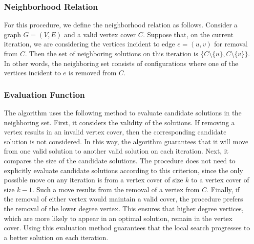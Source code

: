 \documentclass{sig-alternate-05-2015}
\begin{document}
\subsubsection{Neighborhood Relation}
For this procedure, we define the neighborhood relation as follows. Consider a graph $G=(V,E)$ and a valid vertex cover $C$. Suppose that, on the current iteration, we are considering the vertices incident to edge $e=(u,v)$ for removal from $C$. Then the set of neighboring solutions on this iteration is $ \lbrace C \setminus \lbrace u \rbrace, C \setminus \lbrace v \rbrace \rbrace$. In other words, the neighboring set consists of configurations where one of the vertices incident to $e$ is removed from $C$.  
\subsubsection{Evaluation Function}
The algorithm uses the following method to evaluate candidate solutions in the neighboring set. First, it considers the validity of the solutions. If removing a vertex results in an invalid vertex cover, then the corresponding candidate solution is not considered. In this way, the algorithm guarantees that it will move from one valid solution to another valid solution on each iteration. Next, it compares the size of the candidate solutions. The procedure does not need to explicitly evaluate candidate solutions according to this criterion, since the only possible move on any iteration is from a vertex cover of size $k$ to a vertex cover of size $k-1$. Such a move results from the removal of a vertex from $C$. Finally, if the removal of either vertex would maintain a valid cover, the procedure prefers the removal of the lower degree vertex. This ensures that higher degree vertices, which are more likely to appear in an optimal solution, remain in the vertex cover. Using this evaluation method guarantees that the local search progresses to a better solution on each iteration.
\end{document}
